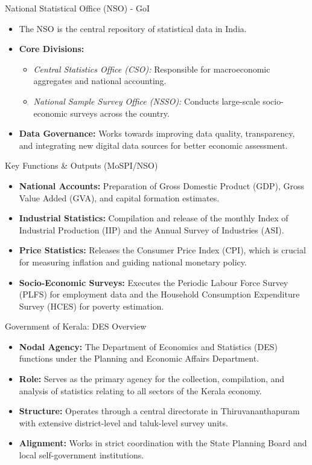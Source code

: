 \documentclass[aspectratio=169]{beamer}
\begin{document}
\begin{frame}{National Statistical Office (NSO) - GoI}
    \begin{itemize}
        \item The NSO is the central repository of statistical data in India.
        \item \textbf{Core Divisions:}
        \begin{itemize}
            \item \textit{Central Statistics Office (CSO):} Responsible for macroeconomic aggregates and national accounting.
            \item \textit{National Sample Survey Office (NSSO):} Conducts large-scale socio-economic surveys across the country.
        \end{itemize}
        \item \textbf{Data Governance:} Works towards improving data quality, transparency, and integrating new digital data sources for better economic assessment.
    \end{itemize}
\end{frame}

\begin{frame}{Key Functions \& Outputs (MoSPI/NSO)}
    \begin{itemize}
        \item \textbf{National Accounts:} Preparation of Gross Domestic Product (GDP), Gross Value Added (GVA), and capital formation estimates.
        \item \textbf{Industrial Statistics:} Compilation and release of the monthly Index of Industrial Production (IIP) and the Annual Survey of Industries (ASI).
        \item \textbf{Price Statistics:} Releases the Consumer Price Index (CPI), which is crucial for measuring inflation and guiding national monetary policy.
        \item \textbf{Socio-Economic Surveys:} Executes the Periodic Labour Force Survey (PLFS) for employment data and the Household Consumption Expenditure Survey (HCES) for poverty estimation.
    \end{itemize}
\end{frame}

\begin{frame}{Government of Kerala: DES Overview}
    \begin{itemize}
        \item \textbf{Nodal Agency:} The Department of Economics and Statistics (DES) functions under the Planning and Economic Affairs Department.
        \item \textbf{Role:} Serves as the primary agency for the collection, compilation, and analysis of statistics relating to all sectors of the Kerala economy.
        \item \textbf{Structure:} Operates through a central directorate in Thiruvananthapuram with extensive district-level and taluk-level survey units.
        \item \textbf{Alignment:} Works in strict coordination with the State Planning Board and local self-government institutions.
    \end{itemize}
\end{frame}
\end{document}
